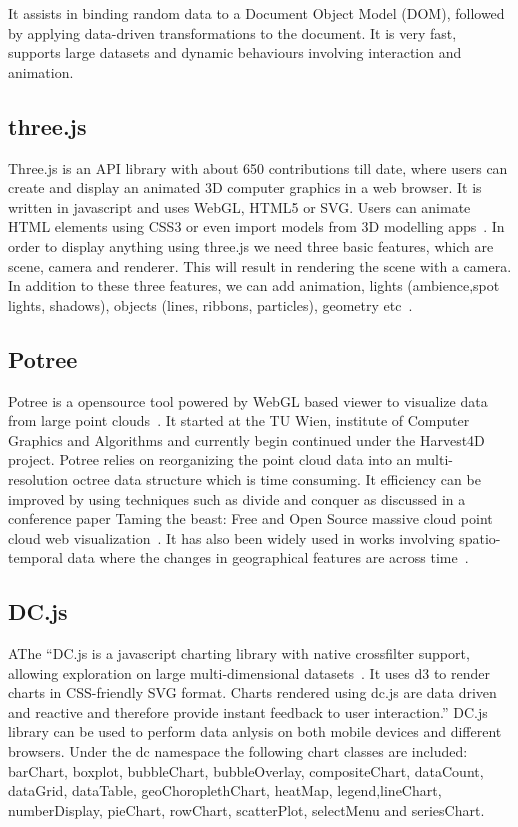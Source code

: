     It assists in binding random data to a Document Object Model
    (DOM), followed by applying data-driven transformations to the
    document. It is very fast, supports large datasets and dynamic
    behaviours involving interaction and animation.

    
\subsection{three.js}

Three.js is an API library with about 650 contributions till date,
where users can create and display an animated 3D computer graphics in
a web browser. It is written in javascript and uses WebGL, HTML5 or
SVG. Users can animate HTML elements using CSS3 or even import models
from 3D modelling apps~\cite{www-threejs-wiki}. In order to display
anything using three.js we need three basic features, which are scene,
camera and renderer. This will result in rendering the scene with a
camera. In addition to these three features, we can add animation,
lights (ambience,spot lights, shadows), objects (lines, ribbons,
particles), geometry etc~\cite{www-threejs-webpage}.
    
\subsection{Potree }

Potree is a opensource tool powered by WebGL based viewer to visualize
data from large point clouds~\cite{www-potree}.  It started at the TU
Wien, institute of Computer Graphics and Algorithms and currently
begin continued under the Harvest4D project. Potree relies on
reorganizing the point cloud data into an multi-resolution octree data
structure which is time consuming. It efficiency can be improved by
using techniques such as divide and conquer as discussed in a
conference paper Taming the beast: Free and Open Source massive cloud
point cloud web visualization~\cite{potree-paper-1}. It has also been
widely used in works involving spatio-temporal data where the changes
in geographical features are across time~\cite{potree-paper-2}.

    \pv
    
\subsection{DC.js}

AThe ``DC.js is a javascript charting library with
native crossfilter support, allowing exploration on large
multi-dimensional datasets~\cite{www-dcjs}. It uses d3 to render
charts in CSS-friendly SVG format. Charts rendered using dc.js are
data driven and reactive and therefore provide instant feedback to
user interaction.'' DC.js library can be used to perform data anlysis
on both mobile devices and different browsers. Under the dc namespace
the following chart classes are included: barChart, boxplot,
bubbleChart, bubbleOverlay, compositeChart, dataCount, dataGrid,
dataTable, geoChoroplethChart, heatMap, legend,lineChart,
numberDisplay, pieChart, rowChart, scatterPlot, selectMenu and
seriesChart.

